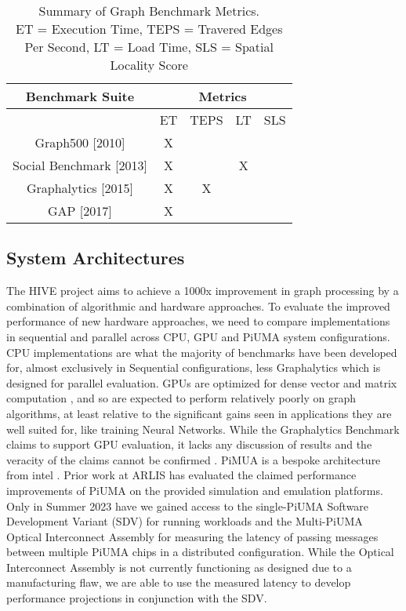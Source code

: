 \documentclass[letterpaper, 10pt]{article}
\begin{document}
\begin{multicols}{2}
        \scriptsize
        \begin{table*}[h!]
        \centering
          \begin{tabular}{|c|c|c|c|c|}
            \hline
            {Benchmark Suite} & \multicolumn{4}{|c|}{Metrics} \\
            \hline
                                                      & ET & TEPS & LT & SLS\\
            \hline
             Graph500 [2010]\cite{Murphy2010}         &  X &      &    &     \\
             Social Benchmark [2013]\cite{Angles2013} &  X &      & X  &     \\
             Graphalytics [2015]\cite{Capota2015}     &  X &   X  &    &     \\
             GAP [2017]\cite{Beamer2017}              &  X &      &    &     \\
            \hline
          \end{tabular}
          \caption{Summary of Graph Benchmark Metrics.\\ ET = Execution Time, TEPS = Travered Edges Per Second, LT = Load Time, SLS = Spatial Locality Score}
          \label{table:graphMetrics}
        \end{table*}
        \normalsize

        \subsection{System Architectures}
        The HIVE project aims to achieve a 1000x improvement in graph processing by a combination of algorithmic and hardware approaches. 
        To evaluate the improved performance of new hardware approaches, we need to compare implementations in sequential and parallel across CPU, GPU and PiUMA system configurations. 
        CPU implementations are what the majority of benchmarks have been developed for, almost exclusively in Sequential configurations, less Graphalytics \cite{Capota2015} which is designed for parallel evaluation. 
        GPUs are optimized for dense vector and matrix computation \cite{Dally2021}, and so are expected to perform relatively poorly on graph algorithms, at least relative to the significant gains seen in applications they are well suited for, like training Neural Networks. While the Graphalytics Benchmark claims to support GPU evaluation, it lacks any discussion of results and the veracity of the claims cannot be confirmed \cite{Capota2015}.
        PiMUA is a bespoke architecture from intel \cite{Aananthakrishnan2020}. 
        Prior work at ARLIS has evaluated the claimed performance improvements of PiUMA on the provided simulation and emulation platforms. 
        Only in Summer 2023 have we gained access to the single-PiUMA Software Development Variant (SDV) for running workloads and the Multi-PiUMA Optical Interconnect Assembly for measuring the latency of passing messages between multiple PiUMA chips in a distributed configuration. 
        While the Optical Interconnect Assembly is not currently functioning as designed due to a manufacturing flaw, we are able to use the measured latency to develop performance projections in conjunction with the SDV. 
        

\end{multicols}
\end{document}
